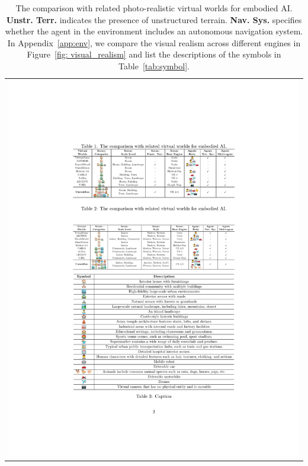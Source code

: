 \documentclass{article}
\begin{document}
\begin{table}[t]
\centering
    \caption{The comparison with related photo-realistic virtual worlds for embodied AI. \textbf{Unstr. Terr.} indicates the presence of unstructured terrain. \textbf{Nav. Sys.} specifies whether the agent in the environment includes an autonomous navigation system. In Appendix~\ref{app:env}, we compare the visual realism across different engines in Figure~\ref{fig: visual_realism} and list the descriptions of the symbols in Table~\ref{tab:symbol}.}
\label{tab:env_comparision}
\begin{tabular}{c}
\begin{minipage}{1\textwidth}
\includegraphics[width=\linewidth]{image/Compare_sim.pdf}
\end{minipage} 
\end{tabular}
\vspace{-0.5cm}
\end{table}


\renewcommand{\arraystretch}{1.1}
\end{document}
